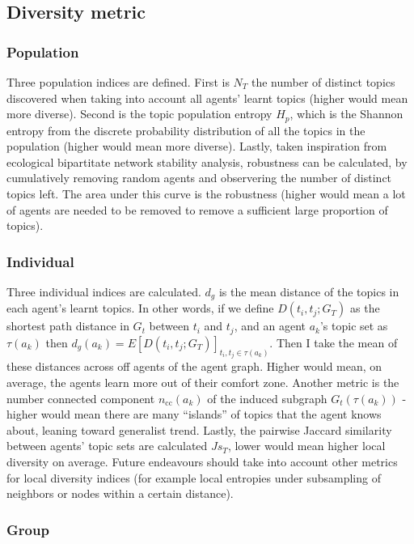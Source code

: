 \subsection{Diversity metric}

\subsubsection*{Population}

Three population indices are defined. First is $N_T$ the number of distinct topics discovered when taking into account all agents' learnt topics (higher would mean more diverse). Second is the topic population entropy $H_p$, which is the Shannon entropy from the discrete probability distribution of all the topics in the population (higher would mean more diverse). Lastly, taken inspiration from ecological bipartitate network stability analysis, robustness can be calculated, by cumulatively removing random agents and observering the number of distinct topics left. The area under this curve is the robustness (higher would mean a lot of agents are needed to be removed to remove a sufficient large proportion of topics).

\subsubsection*{Individual}

Three individual indices are calculated. $d_g$ is the mean distance of the topics in each agent's learnt topics. In other words, if we define $D(t_i,t_j;G_T)$ as the shortest path distance in $G_t$ between $t_i$ and $t_j$, and an agent $a_k$'s topic set as $\tau(a_k)$ then $d_g(a_k) = E\left[D(t_i,t_j;G_T)\right]_{t_i, t_j \in \tau(a_k)}$. Then I take the mean of these distances across off agents of the agent graph. Higher would mean, on average, the agents learn more out of their comfort zone. Another metric is the number connected component $n_{\mathrm{cc}}(a_k)$ of the induced subgraph $G_t(\tau(a_k))$ - higher would mean there are many ``islands'' of topics that the agent knows about, leaning toward generalist trend. Lastly, the pairwise Jaccard similarity between agents' topic sets are calculated $Js_T$, lower would mean higher local diversity on average. Future endeavours should take into account other metrics for local diversity indices (for example local entropies under subsampling of neighbors or nodes within a certain distance).

\subsubsection*{Group}

